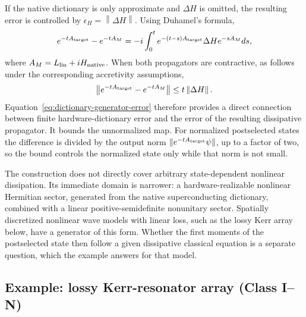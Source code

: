 \documentclass[pra,twocolumn,superscriptaddress,nofootinbib,floatfix]{revtex4-2}
\theoremstyle{remark}
\begin{document}
If the native dictionary is only approximate and \(\Delta H\) is omitted, the resulting error is controlled by \(\epsilon_H=\left\|\Delta H\right\|.\) Using Duhamel's formula,
\begin{align}
e^{-tA_{\rm target}}-e^{-tA_M}=-i\int_0^te^{-(t-s)A_{\rm target}}\Delta He^{-sA_M}ds,
\end{align}
where \(A_M=L_{\rm lin}+iH_{\rm native}\). When both propagators are contractive, as follows under the corresponding accretivity assumptions,
\begin{align}
\left\|e^{-tA_{\rm target}}-e^{-tA_M}\right\|\leq t\left\|\Delta H\right\|.
\label{eq:dictionary-generator-error}
\end{align}
Equation~\eqref{eq:dictionary-generator-error} therefore provides a direct connection between finite hardware-dictionary error and the error of the resulting dissipative propagator. It bounds the unnormalized map. For normalized postselected states the difference is divided by the output norm \(\|e^{-tA_{\rm target}}\psi\|\), up to a factor of two, so the bound controls the normalized state only while that norm is not small.

The construction does not directly cover arbitrary state-dependent nonlinear dissipation. Its immediate domain is narrower: a hardware-realizable nonlinear Hermitian sector, generated from the native superconducting dictionary, combined with a linear positive-semidefinite nonunitary sector. Spatially discretized nonlinear wave models with linear loss, such as the lossy Kerr array below, have a generator of this form. Whether the first moments of the postselected state then follow a given dissipative classical equation is a separate question, which the example answers for that model.

\subsection*{Example: lossy Kerr-resonator array (Class I--N)}
\end{document}
